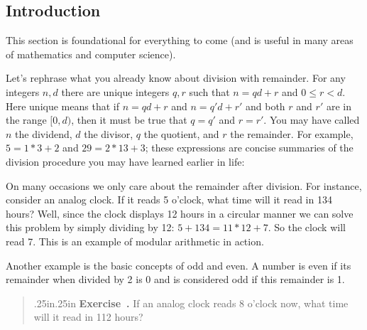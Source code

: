 \documentclass[12 pt]{article}
\newcounter{exercise}[section]
\newenvironment{exercise}{\refstepcounter{exercise}\par\bigskip \begin{quotation}{}{\leftmargin .25in\rightmargin .25in}
	\noindent \textbf{Exercise~\thesection.\theexercise }  \rmfamily}{\end{quotation}\par\bigskip}
\begin{document}
\subsection{Introduction}
This section is foundational for everything to come (and is useful in many areas of mathematics and computer science).

Let's rephrase what you already know about division with remainder. For any integers $n,d$ there are unique integers $q,r$ such that $n=qd+r$ and $0 \leq r<d$. Here unique means that if $n=qd+r$ and $n=q'd+r'$ and both $r$ and $r'$ are in the range $[0,d)$, then it must be true that $q=q'$ and $r=r'$. You may have called $n$ the dividend, $d$ the divisor, $q$ the quotient, and $r$ the remainder. For example, $5=1*3+2$ and $29=2*13+3$; these expressions are concise summaries of the division procedure you may have learned earlier in life:

\begin{center}
\end{center}

On many occasions we only care about the remainder after division. For instance, consider an analog clock. If it reads 5 o'clock, what time will it read in 134 hours? Well, since the clock displays 12 hours in a circular manner we can solve this problem by simply dividing by 12: $5+134=11*12+7$. So the clock will read 7. This is an example of modular arithmetic in action.

Another example is the basic concepts of odd and even. A number is even if its remainder when divided by 2 is 0 and is considered odd if this remainder is 1.

\begin{exercise}
If an analog clock reads $8$ o'clock now, what time will it read in 112 hours?
\end{exercise}
\end{document}
